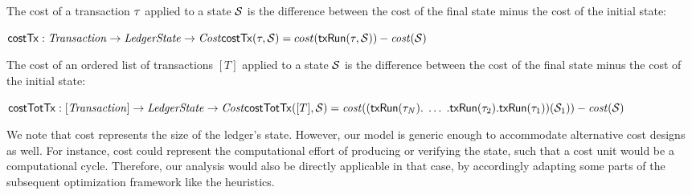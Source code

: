 \begin{definition}\label{def:tx-cost}
    The cost of a transaction $\tau$ applied to a state $\mathcal{S}$ is the
    difference between the cost of the final state minus the cost of the
    initial state:

    \begin{math}\\
        \mathsf{costTx}: \mathit{Transaction} \rightarrow \mathit{LedgerState} \rightarrow \mathit{Cost} \\
        \mathsf{costTx}(\tau, \mathcal{S}) = cost(\mathsf{txRun}(\tau,
        \mathcal{S})) - \mathit{cost}(\mathcal{S})\\
    \end{math}

        The cost of an ordered list of transactions $[T]$ applied to a state
        $\mathcal{S}$ is the difference between the cost of the final state
        minus the cost of the initial state:

	\begin{math}\\
            \mathsf{costTotTx}: [\mathit{Transaction}] \rightarrow \mathit{LedgerState} \rightarrow
                \mathit{Cost}\\
		\mathsf{costTotTx}([T], \mathcal{S}) =
                        \mathit{cost}((\mathsf{txRun}(\tau_N).\; \dots\; .\mathsf{txRun}(\tau_2) .
                        \mathsf{txRun}(\tau_1))(\mathcal{S}_1)) - \mathit{cost}(\mathcal{S})
	\end{math}
\end{definition}

We note that cost represents the size of the ledger's state. However, our model
is generic enough to accommodate alternative cost designs as well. For
instance, cost could represent the computational effort of producing or
verifying the state, such that a cost unit would be a computational cycle.
Therefore, our analysis would also be directly applicable in that case, by
accordingly adapting some parts of the subsequent optimization framework like
the heuristics.

